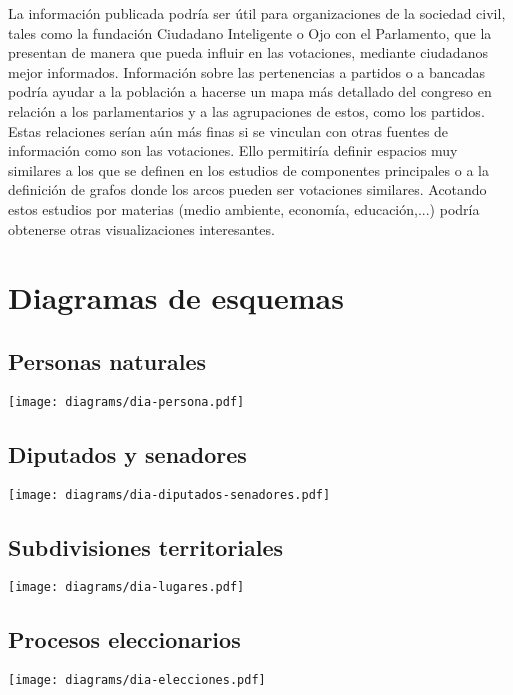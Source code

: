 \documentclass[letterpaper,titlepage]{article}
\begin{document}
La información publicada podría ser útil para organizaciones de la
sociedad civil, tales como la fundación Ciudadano Inteligente o Ojo
con el Parlamento, que la presentan de manera que pueda influir en las
votaciones, mediante ciudadanos mejor informados. Información sobre
las pertenencias a partidos o a bancadas podría ayudar a la población
a hacerse un mapa más detallado del congreso en relación a los
parlamentarios y a las agrupaciones de estos, como los partidos. Estas
relaciones serían aún más finas si se vinculan con otras fuentes de
información como son las votaciones. Ello permitiría definir espacios
muy similares a los que se definen en los estudios de componentes
principales o a la definición de grafos donde los arcos pueden ser
votaciones similares. Acotando estos estudios por materias (medio
ambiente, economía, educación,...) podría obtenerse otras
visualizaciones interesantes.

\newpage
\appendix

\section{Diagramas de esquemas}
\label{diagramas}

\subsection{Personas naturales}
\begin{center}
  \texttt{[image: diagrams/dia-persona.pdf]}
\end{center}

\subsection{Diputados y senadores}
\begin{center}
  \texttt{[image: diagrams/dia-diputados-senadores.pdf]}
\end{center}

\subsection{Subdivisiones territoriales}
\begin{center}
  \texttt{[image: diagrams/dia-lugares.pdf]}
\end{center}

\subsection{Procesos eleccionarios}
\begin{center}
  \texttt{[image: diagrams/dia-elecciones.pdf]}
\end{center}
\end{document}
